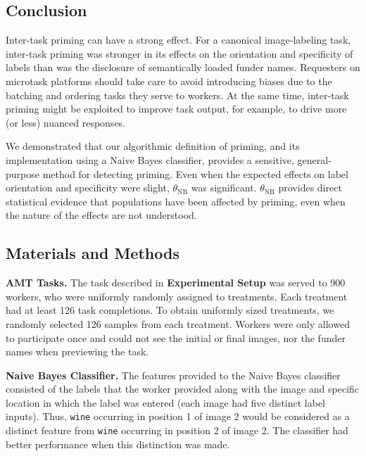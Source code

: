\documentclass[a4paper]{report}
\begin{document}
\subsection*{Conclusion}


Inter-task priming can have a strong effect.  
For a canonical image-labeling task, inter-task priming was stronger in its 
effects on the orientation and specificity of labels than was the disclosure of
semantically loaded funder names.  Requesters on microtask platforms should 
take care to avoid introducing biases due to the batching and ordering tasks 
they serve to workers.  At the same time, inter-task priming might be exploited to improve task output, for 
example, to drive more (or less) nuanced responses.

We demonstrated that our algorithmic definition of priming, and its 
implementation using a Naive Bayes classifier, provides a sensitive,
general-purpose method for detecting priming.  Even when the expected effects 
on label orientation and specificity were slight, $\theta_\text{NB}$ 
was significant.  $\theta_\text{NB}$ provides direct statistical evidence that 
populations have been affected by priming, even when the nature of the 
effects are not understood. 

\subsection*{Materials and Methods}

\textbf{AMT Tasks.} The task described in \textbf{Experimental Setup}
was served to 900 workers, who were uniformly randomly assigned to
treatments.  Each treatment had at least 126 task completions.  To obtain 
uniformly sized treatments, we randomly selected 126 samples from each 
treatment. Workers were
only allowed to participate once and could not see the initial or final 
images, nor the funder names when previewing the task.

\textbf{Naive Bayes Classifier.}
The features provided to the Naive Bayes classifier consisted of the labels
that the worker provided along with the image and specific location in which 
the label was entered
(each image had five distinct label inputs).  Thus, \texttt{wine} occurring in 
position 1 of image 2 would be considered as a distinct feature from 
\texttt{wine} occurring in position 2 of image 2. The classifier 
had better performance when this distinction was made.
\end{document}
